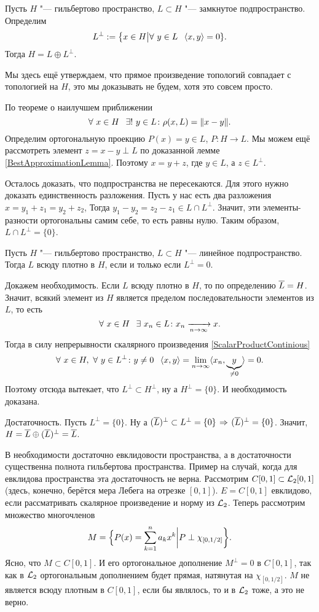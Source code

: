 \begin{The}
  Пусть $H$ "--- гильбертово пространство, $L\subset H$ "--- замкнутое подпространство. Определим
\[
  L^{\perp} := \big\{x\in H\big|\forall\ y\in L\pau \la x,y\ra =0\}.
\]
Тогда $H = L\oplus L^{\perp}$.
\end{The}
Мы здесь ещё утверждаем, что прямое произведение топологий совпадает с топологией на $H$, это мы доказывать не будем, хотя это совсем просто.
\begin{Proof}
  По теореме о наилучшем приближении 
\[
 \forall\ x\in H\pau \exists!\ y\in L\colon \rho(x,L) = \|x-y\|.
\]
Определим ортогональную проекцию $P(x) = y\in L$, $P\colon H\to L$. Мы можем ещё рассмотреть элемент $z = x-y\perp L$ по доказанной лемме \ref{BestApproximationLemma}. Поэтому $x = y+z$, где $y\in L$, а $z\in L^{\perp}$.

Осталось доказать, что подпространства не пересекаются. Для этого нужно доказать единственность разложения. Пусть у нас есть два разложения $x = y_1+z_1 = y_2+ z_2$, Тогда $y_1-y_2=z_2-z_1\in L\cap L^{\perp}$. Значит, эти элементы-разности ортогональны самим себе, то есть равны нулю. Таким образом, $L\cap L^{\perp} = \{0\}$.
\end{Proof}
\begin{Sl}
   Пусть $H$ "--- гильбертово пространство, $L\subset H$ "--- линейное подпространство. Тогда $L$ всюду плотно в $H$, если и только если $L^\perp =0$.
\end{Sl}
\begin{Proof}
  Докажем необходимость. Если $L$ всюду плотно в $H$, то по определению $\overline{L}=H$. Значит, всякий элемент из $H$ является пределом последовательности элементов из $L$, то есть 
\[
  \forall\ x\in H\pau \exists\ x_n\in L\colon x_n\te x.
\]
Тогда в силу непрерывности скалярного произведения \ref{ScalarProductContinious} 
\[
	\forall\ x\in H,\ 
  \forall\ y\in L^\perp\colon y\ne0\pau \la x,y\ra = \yo n\infty \la x_n,\underbrace{y}_{\ne0}\ra = 0.
\]
Поэтому отсюда вытекает, что $L^\perp\subset H^\perp$, ну а $H^{\perp} = \{0\}$. И необходимость доказана.

Достаточность. Пусть $L^\perp = \{0\}$. Ну а $(\overline{L})^\perp\subset L^\perp = \{0\}\hspace{1pt plus1pt}\Rightarrow\hspace{1pt plus1pt} (\overline{L})^\perp=\{0\}$. Значит, $H = \overline{L}\oplus {(\overline{L})^\perp} = \overline{L}$.
\end{Proof}

В необходимости достаточно евклидовости пространства, а в достаточности существенна полнота гильбертова пространства.
Пример на случай, когда для евклидова пространства эта достаточность не верна. Рассмотрим $C[0,1]\subset \mathcal L_2[0,1]$ (здесь, конечно, берётся мера Лебега на отрезке $[0,1]$). $E = C[0,1]$ евклидово, если рассматривать скалярное произведение и норму из $\mathcal L_2$. Теперь рассмотрим множество многочленов 
\[
  M = \Big\{P(x) = \sum\limits_{k = 1}^{n}a_kx^k\bigg| P\perp\chi_{[0,1/2]}\bigg\}.
\]
Ясно, что $M\subset C[0,1]$.
И его ортогональное дополнение $M^\perp=0$ в $C[0,1]$, так как в $\mathcal L_2$ ортогональным дополнением будет прямая, натянутая на $\chi_{[0,1/2]}$. $M$ не является всюду плотным в $C[0,1]$, если бы являлось, то и в $\mathcal L_2$ тоже, а это не верно.

